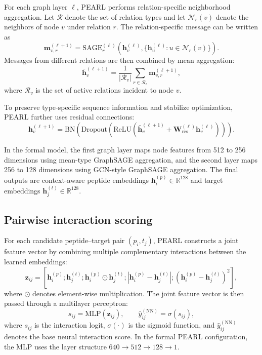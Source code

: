 For each graph layer $\ell$, PEARL performs relation-specific neighborhood aggregation. Let $\mathcal{R}$ denote the set of relation types and let $\mathcal{N}_{r}(v)$ denote the neighbors of node $v$ under relation $r$. The relation-specific message can be written as
\begin{equation}
\mathbf{m}_{v,r}^{(\ell+1)}
=
\mathrm{SAGE}_{r}^{(\ell)}
\left(
\mathbf{h}_{v}^{(\ell)},
\{\mathbf{h}_{u}^{(\ell)} : u \in \mathcal{N}_{r}(v)\}
\right).
\end{equation}
Messages from different relations are then combined by mean aggregation:
\begin{equation}
\bar{\mathbf{h}}_{v}^{(\ell+1)}
=
\frac{1}{|\mathcal{R}_{v}|}
\sum_{r \in \mathcal{R}_{v}}
\mathbf{m}_{v,r}^{(\ell+1)},
\end{equation}
where $\mathcal{R}_{v}$ is the set of active relations incident to node $v$.

To preserve type-specific sequence information and stabilize optimization, PEARL further uses residual connections:
\begin{equation}
\mathbf{h}_{v}^{(\ell+1)}
=
\mathrm{BN}
\left(
\mathrm{Dropout}
\left(
\mathrm{ReLU}
\left(
\bar{\mathbf{h}}_{v}^{(\ell+1)}
+ \mathbf{W}_{\mathrm{res}}^{(\ell)} \mathbf{h}_{v}^{(\ell)}
\right)
\right)
\right).
\end{equation}

In the formal model, the first graph layer maps node features from 512 to 256 dimensions using mean-type GraphSAGE aggregation, and the second layer maps 256 to 128 dimensions using GCN-style GraphSAGE aggregation. The final outputs are context-aware peptide embeddings $\mathbf{h}_{i}^{(p)} \in \mathbb{R}^{128}$ and target embeddings $\mathbf{h}_{j}^{(t)} \in \mathbb{R}^{128}$.

\subsection{Pairwise interaction scoring}

For each candidate peptide--target pair $(p_i, t_j)$, PEARL constructs a joint feature vector by combining multiple complementary interactions between the learned embeddings:
\begin{equation}
\mathbf{z}_{ij}
=
\left[
\mathbf{h}_{i}^{(p)};
\mathbf{h}_{j}^{(t)};
\mathbf{h}_{i}^{(p)} \odot \mathbf{h}_{j}^{(t)};
\left| \mathbf{h}_{i}^{(p)} - \mathbf{h}_{j}^{(t)} \right|;
\left( \mathbf{h}_{i}^{(p)} - \mathbf{h}_{j}^{(t)} \right)^{2}
\right],
\end{equation}
where $\odot$ denotes element-wise multiplication. The joint feature vector is then passed through a multilayer perceptron:
\begin{equation}
s_{ij} = \mathrm{MLP}(\mathbf{z}_{ij}),
\qquad
\hat{y}_{ij}^{(\mathrm{NN})} = \sigma(s_{ij}),
\end{equation}
where $s_{ij}$ is the interaction logit, $\sigma(\cdot)$ is the sigmoid function, and $\hat{y}_{ij}^{(\mathrm{NN})}$ denotes the base neural interaction score. In the formal PEARL configuration, the MLP uses the layer structure $640 \rightarrow 512 \rightarrow 128 \rightarrow 1$.

